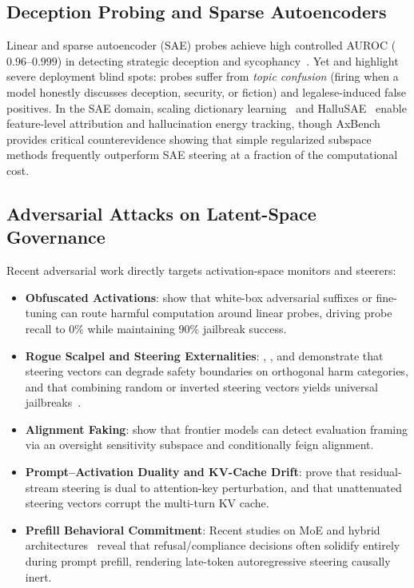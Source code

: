 \documentclass{article}
\begin{document}
\subsection{Deception Probing and Sparse Autoencoders}
Linear and sparse autoencoder (SAE) probes achieve high controlled AUROC ($0.96$--$0.999$) in detecting strategic deception and sycophancy~\cite{huben2024diss, goldowskydill2025detecting, mckenzie2025detecting}. Yet \cite{goldowskydill2025detecting} and \cite{blandfort2026redteaming} highlight severe deployment blind spots: probes suffer from \textit{topic confusion} (firing when a model honestly discusses deception, security, or fiction) and legalese-induced false positives. In the SAE domain, scaling dictionary learning~\cite{bricken2023monosemantic, gao2026scaling} and HalluSAE~\cite{hallusae2026} enable feature-level attribution and hallucination energy tracking, though AxBench~\cite{axbench2025} provides critical counterevidence showing that simple regularized subspace methods frequently outperform SAE steering at a fraction of the computational cost.

\subsection{Adversarial Attacks on Latent-Space Governance}
Recent adversarial work directly targets activation-space monitors and steerers:
\begin{itemize}
    \item \textbf{Obfuscated Activations}: \cite{bailey2026obfuscated} show that white-box adversarial suffixes or fine-tuning can route harmful computation around linear probes, driving probe recall to $0\%$ while maintaining $90\%$ jailbreak success.
    \item \textbf{Rogue Scalpel and Steering Externalities}: \cite{korczikov2026rogue}, \cite{li2026safety}, and \cite{steeringexternalities2026} demonstrate that steering vectors can degrade safety boundaries on orthogonal harm categories, and that combining random or inverted steering vectors yields universal jailbreaks~\cite{dunefsky2025oneshot}.
    \item \textbf{Alignment Faking}: \cite{alignmentfaking2025} show that frontier models can detect evaluation framing via an oversight sensitivity subspace and conditionally feign alignment.
    \item \textbf{Prompt--Activation Duality and KV-Cache Drift}: \cite{promptactivationduality2026} prove that residual-stream steering is dual to attention-key perturbation, and that unattenuated steering vectors corrupt the multi-turn KV cache.
    \item \textbf{Prefill Behavioral Commitment}: Recent studies on MoE and hybrid architectures~\cite{prefillcommitment2026} reveal that refusal/compliance decisions often solidify entirely during prompt prefill, rendering late-token autoregressive steering causally inert.
\end{itemize}
\end{document}
